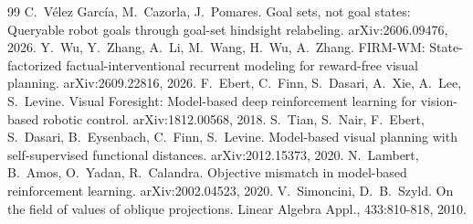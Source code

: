 \begin{thebibliography}{99}
 C.~V\'elez Garc\'ia, M.~Cazorla, J.~Pomares. Goal sets, not goal states: Queryable robot goals through goal-set hindsight relabeling. arXiv:2606.09476, 2026.
 Y.~Wu, Y.~Zhang, A.~Li, M.~Wang, H.~Wu, A.~Zhang. FIRM-WM: State-factorized factual-interventional recurrent modeling for reward-free visual planning. arXiv:2609.22816, 2026.
 F.~Ebert, C.~Finn, S.~Dasari, A.~Xie, A.~Lee, S.~Levine. Visual Foresight: Model-based deep reinforcement learning for vision-based robotic control. arXiv:1812.00568, 2018.
 S.~Tian, S.~Nair, F.~Ebert, S.~Dasari, B.~Eysenbach, C.~Finn, S.~Levine. Model-based visual planning with self-supervised functional distances. arXiv:2012.15373, 2020.
 N.~Lambert, B.~Amos, O.~Yadan, R.~Calandra. Objective mismatch in model-based reinforcement learning. arXiv:2002.04523, 2020.
 V.~Simoncini, D.~B.~Szyld. On the field of values of oblique projections. Linear Algebra Appl., 433:810-818, 2010.
\end{thebibliography}
